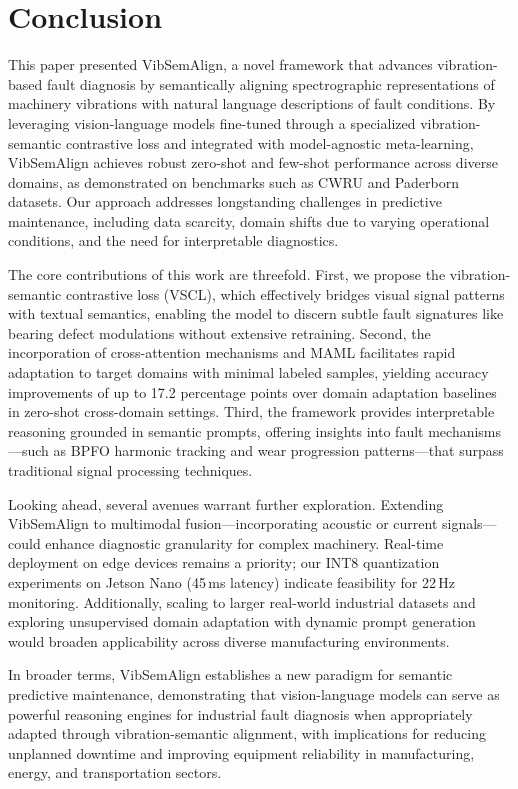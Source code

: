 \section{Conclusion}

This paper presented VibSemAlign, a novel framework that advances vibration-based fault diagnosis by semantically aligning spectrographic representations of machinery vibrations with natural language descriptions of fault conditions. By leveraging vision-language models fine-tuned through a specialized vibration-semantic contrastive loss and integrated with model-agnostic meta-learning, VibSemAlign achieves robust zero-shot and few-shot performance across diverse domains, as demonstrated on benchmarks such as CWRU and Paderborn datasets. Our approach addresses longstanding challenges in predictive maintenance, including data scarcity, domain shifts due to varying operational conditions, and the need for interpretable diagnostics.

The core contributions of this work are threefold. First, we propose the vibration-semantic contrastive loss (VSCL), which effectively bridges visual signal patterns with textual semantics, enabling the model to discern subtle fault signatures like bearing defect modulations without extensive retraining. Second, the incorporation of cross-attention mechanisms and MAML facilitates rapid adaptation to target domains with minimal labeled samples, yielding accuracy improvements of up to 17.2 percentage points over domain adaptation baselines in zero-shot cross-domain settings. Third, the framework provides interpretable reasoning grounded in semantic prompts, offering insights into fault mechanisms---such as BPFO harmonic tracking and wear progression patterns---that surpass traditional signal processing techniques.

Looking ahead, several avenues warrant further exploration. Extending VibSemAlign to multimodal fusion---incorporating acoustic or current signals---could enhance diagnostic granularity for complex machinery. Real-time deployment on edge devices remains a priority; our INT8 quantization experiments on Jetson Nano (45\,ms latency) indicate feasibility for 22\,Hz monitoring. Additionally, scaling to larger real-world industrial datasets and exploring unsupervised domain adaptation with dynamic prompt generation would broaden applicability across diverse manufacturing environments.

In broader terms, VibSemAlign establishes a new paradigm for semantic predictive maintenance, demonstrating that vision-language models can serve as powerful reasoning engines for industrial fault diagnosis when appropriately adapted through vibration-semantic alignment, with implications for reducing unplanned downtime and improving equipment reliability in manufacturing, energy, and transportation sectors.
